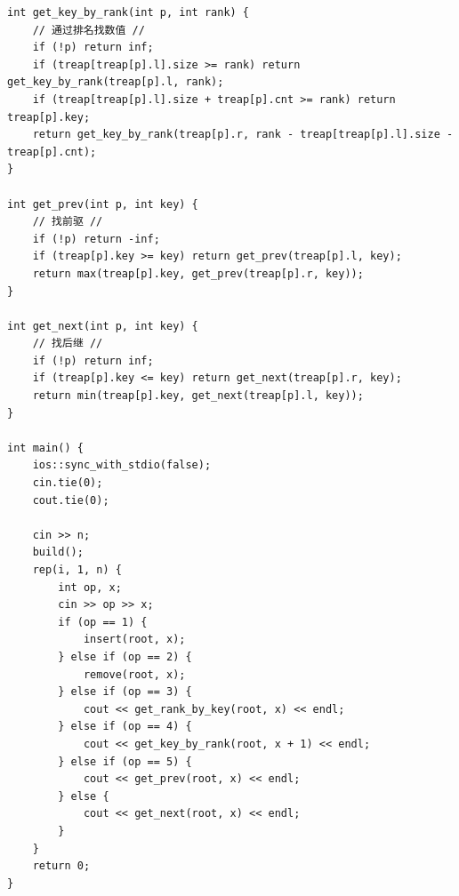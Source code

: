 \documentclass[UTF8, a4paper, titlepage, twoside]{ctexart}
\begin{document}
\begin{lstlisting}[style=cpp]
int get_key_by_rank(int p, int rank) {
    // 通过排名找数值 //
    if (!p) return inf;
    if (treap[treap[p].l].size >= rank) return get_key_by_rank(treap[p].l, rank);
    if (treap[treap[p].l].size + treap[p].cnt >= rank) return treap[p].key;
    return get_key_by_rank(treap[p].r, rank - treap[treap[p].l].size - treap[p].cnt);
}

int get_prev(int p, int key) {
    // 找前驱 //
    if (!p) return -inf;
    if (treap[p].key >= key) return get_prev(treap[p].l, key);
    return max(treap[p].key, get_prev(treap[p].r, key));
}

int get_next(int p, int key) {
    // 找后继 //
    if (!p) return inf;
    if (treap[p].key <= key) return get_next(treap[p].r, key);
    return min(treap[p].key, get_next(treap[p].l, key));
}

int main() {
    ios::sync_with_stdio(false);
    cin.tie(0);
    cout.tie(0);

    cin >> n;
    build();
    rep(i, 1, n) {
        int op, x;
        cin >> op >> x;
        if (op == 1) {
            insert(root, x);
        } else if (op == 2) {
            remove(root, x);
        } else if (op == 3) {
            cout << get_rank_by_key(root, x) << endl;
        } else if (op == 4) {
            cout << get_key_by_rank(root, x + 1) << endl;
        } else if (op == 5) {
            cout << get_prev(root, x) << endl;
        } else {
            cout << get_next(root, x) << endl;
        }
    }
    return 0;
}
\end{lstlisting}
\end{document}
